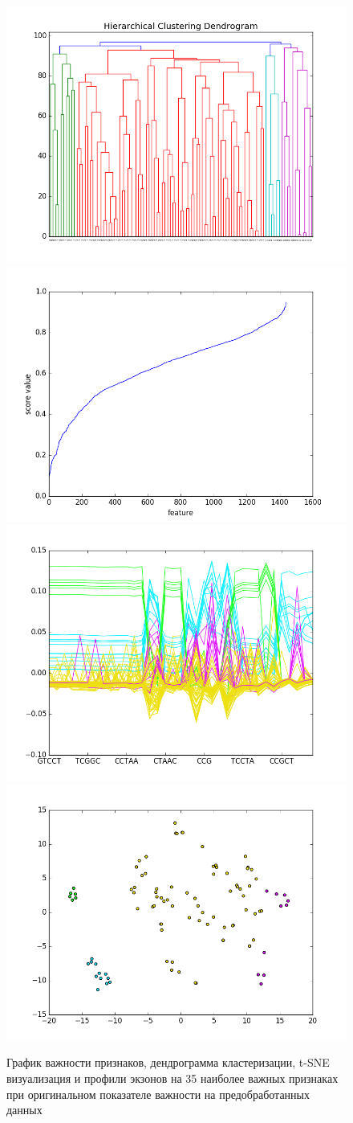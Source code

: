 \begin{figure}[H]
	\includegraphics[width=0.5\linewidth]{pics/dendrograms/lp_norm_cosine.png}
	\includegraphics[width=0.5\linewidth]{pics/graphs/lp_norm_cosine.png}
	\includegraphics[width=0.5\linewidth]{pics/profiles/lp_norm_cosine.png}
	\includegraphics[width=0.5\linewidth]{pics/tsne/lp_norm_cosine.png}
	\caption{График важности признаков, дендрограмма кластеризации, t-SNE визуализация и профили экзонов на 35 наиболее важных признаках при оригинальном показателе важности на предобработанных данных}
	\label{lp_norm_cosine}
\end{figure}


